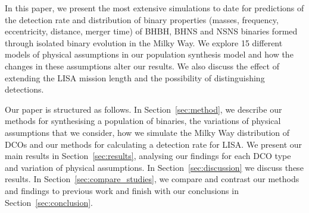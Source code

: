 In this paper, we present the most extensive simulations to date for predictions of the detection rate and distribution of binary properties (masses, frequency, eccentricity, distance, merger time) of BHBH, BHNS and NSNS binaries formed through isolated binary evolution in the Milky Way. We explore 15 different models of physical assumptions in our population synthesis model and how the changes in these assumptions alter our results. We also discuss the effect of extending the LISA mission length and the possibility of distinguishing detections.

Our paper is structured as follows. In Section~\ref{sec:method}, we describe our methods for synthesising a population of binaries, the variations of physical assumptions that we consider, how we simulate the Milky Way distribution of DCOs and our methods for calculating a detection rate for LISA. We present our main results in Section~\ref{sec:results}, analysing our findings for each DCO type and variation of physical assumptions. In Section~\ref{sec:discussion} we discuss these results. In Section~\ref{sec:compare_studies}, we compare and contrast our methods and findings to previous work and finish with our conclusions in Section~\ref{sec:conclusion}.